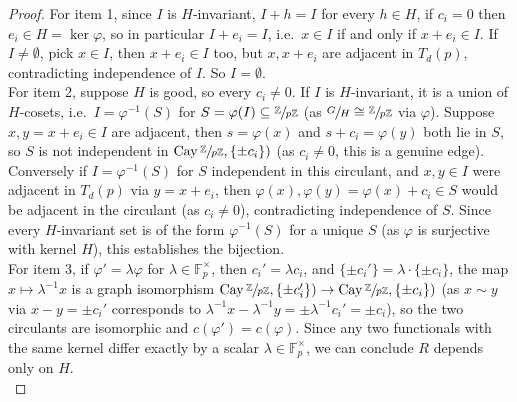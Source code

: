 \documentclass{article}
\theoremstyle{plain}
\theoremstyle{definition}
\theoremstyle{remark}
\newcommand{\Z}{\mathbb{Z}}
\newcommand{\F}{\mathbb{F}}
\newcommand{\quot}[2]{\sfrac{#1}{#2}}
\DeclareMathOperator{\Cay}{Cay}
\begin{document}
\begin{proof}
For item 1, since $I$ is $H$-invariant, $I+h=I$ for every $h\in H$, if $c_i=0$ then $e_i\in H=\ker\varphi$, so in particular $I+e_i=I$, i.e.\ $x\in I$ if and only if $x+e_i\in I$. If $I\ne\emptyset$, pick $x\in I$, then $x+e_i\in I$ too, but $x,x+e_i$ are adjacent in $T_d(p)$, contradicting independence of $I$. So $I=\emptyset$.\\

For item 2, suppose $H$ is good, so every $c_i\ne0$. If $I$ is $H$-invariant, it is a union of $H$-cosets, i.e.\ $I=\varphi^{-1}(S)$ for $S=\varphi(I)\subseteq\quot\Z{p\Z}$ (as $\sfrac{G}{H}\cong\quot\Z{p\Z}$ via $\varphi$). Suppose $x,y=x+e_i\in I$ are adjacent, then $s=\varphi(x)$ and $s+c_i=\varphi(y)$ both lie in $S$, so $S$ is not independent in $\Cay\quot\Z{p\Z},\{\pm c_i\})$ (as $c_i\ne0$, this is a genuine edge). Conversely if $I=\varphi^{-1}(S)$ for $S$ independent in this circulant, and $x,y\in I$ were adjacent in $T_d(p)$ via $y=x+e_i$, then $\varphi(x),\varphi(y)=\varphi(x)+c_i\in S$ would be adjacent in the circulant (as $c_i\ne0$), contradicting independence of $S$. Since every $H$-invariant set is of the form $\varphi^{-1}(S)$ for a unique $S$ (as $\varphi$ is surjective with kernel $H$), this establishes the bijection.\\

For item 3, if $\varphi'=\lambda\varphi$ for $\lambda\in\F_p^\times$, then $c_i'=\lambda c_i$, and $\{\pm c_i'\}=\lambda\cdot\{\pm c_i\}$, the map $x\mapsto\lambda^{-1}x$ is a graph isomorphism $\Cay\quot\Z{p\Z},\{\pm c_i'\})\to\Cay\quot\Z{p\Z},\{\pm c_i\})$ (as $x\sim y$ via $x-y=\pm c_i'$ corresponds to $\lambda^{-1}x-\lambda^{-1}y=\pm\lambda^{-1}c_i'=\pm c_i$), so the two circulants are isomorphic and $c(\varphi')=c(\varphi)$. Since any two functionals with the same kernel differ exactly by a scalar $\lambda\in\F_p^\times$, we can conclude $R$ depends only on $H$.\\


\end{proof}
\end{document}
